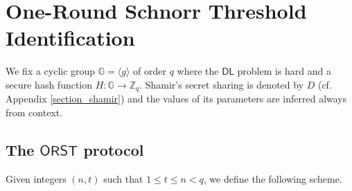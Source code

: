 \documentclass{iacrtrans}
\begin{document}
\section{One-Round Schnorr Threshold Identification}\label{section_orst}

\noindent
We fix a cyclic group $\mathbb{G} = \langle g \rangle$ of order $q$
where the $\mathsf{DL}$ problem is hard and
a secure hash function $H: \mathbb{G} \rightarrow \mathbb{Z}_q$.
Shamir's secret sharing is denoted by $D$
(cf. Appendix \ref{section_shamir}) and the values
of its parameters are inferred always from context.

\subsection{The $\mathsf{ORST}$ protocol}

Given integers $(n, t)$ such that $1 \le t \le n < q$,
we define the following scheme.
\end{document}
